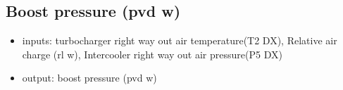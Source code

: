 

\newpage

%
%

\subsection{Boost pressure (pvd w)} %
\begin{itemize}
	\item{inputs: turbocharger right way out air temperature(T2 DX), Relative air charge (rl w), Intercooler right way out air pressure(P5 DX)}
	\item{output: boost pressure (pvd w)}
\end{itemize}

